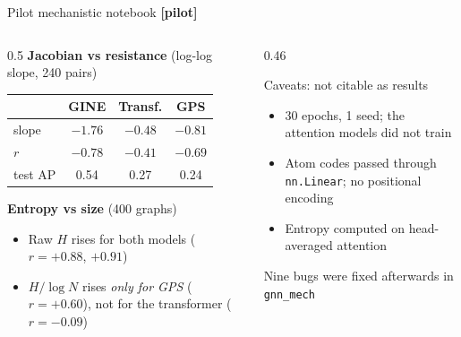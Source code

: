 \documentclass[aspectratio=169,10pt]{beamer}
\newcommand{\pilot}{\textcolor{warm}{\textbf{[pilot]}}}
\begin{document}
\begin{frame}{Pilot mechanistic notebook \pilot}
  \begin{columns}[T]
    \begin{column}{0.5\textwidth}
      \textbf{Jacobian vs resistance} (log-log slope, 240 pairs)
      \begin{center}\small
      \begin{tabular}{@{}lccc@{}}
        \toprule
        & GINE & Transf. & GPS \\
        \midrule
        slope & $-1.76$ & $-0.48$ & $-0.81$ \\
        $r$ & $-0.78$ & $-0.41$ & $-0.69$ \\
        test AP & 0.54 & 0.27 & 0.24 \\
        \bottomrule
      \end{tabular}
      \end{center}
      \textbf{Entropy vs size} (400 graphs)
      \begin{itemize}\small
        \item Raw $H$ rises for both models ($r=+0.88$, $+0.91$)
        \item $H/\log N$ rises \emph{only for GPS} ($r=+0.60$), not for the transformer ($r=-0.09$)
      \end{itemize}
    \end{column}
    \begin{column}{0.46\textwidth}
      \begin{alertblock}{Caveats: not citable as results}
        \small
        \begin{itemize}
          \item 30 epochs, 1 seed; the attention models did not train
          \item Atom codes passed through \texttt{nn.Linear}; no positional encoding
          \item Entropy computed on head-averaged attention
        \end{itemize}
        Nine bugs were fixed afterwards in \texttt{gnn\_mech}
      \end{alertblock}
    \end{column}
  \end{columns}
\end{frame}
\end{document}
